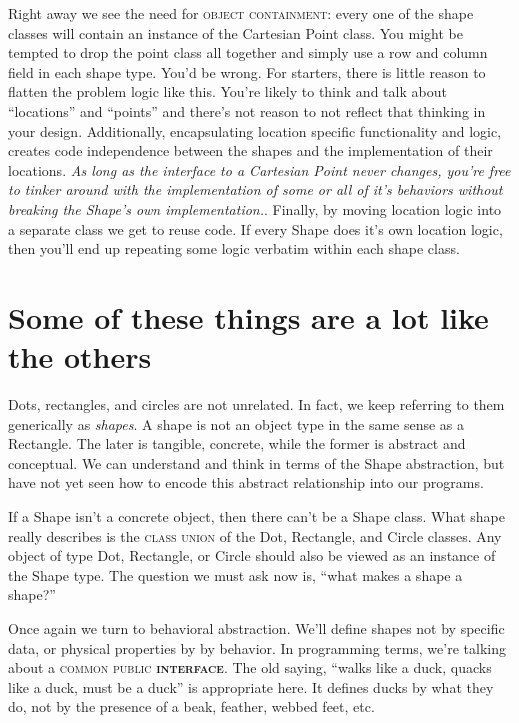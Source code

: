\documentclass[]{tufte-handout}
\begin{document}
Right away we see the need for \textsc{object containment}: every one of the shape classes will contain an instance of the Cartesian Point class. You might be tempted to drop the point class all together and simply use a row and column field in each shape type. You'd be wrong. For starters, there is little reason to flatten the problem logic like this. You're likely to think and talk about ``locations'' and ``points'' and there's not reason to not reflect that thinking in your design. Additionally, encapsulating location specific functionality and logic, creates code independence between the shapes and the implementation of their locations. \textit{As long as the interface to a Cartesian Point never changes, you're free to tinker around with the implementation of some or all of it's behaviors without breaking the Shape's own implementation.}. Finally, by moving location logic into a separate class we get to reuse code. If every Shape does it's own location logic, then you'll end up repeating some logic verbatim within each shape class. 

\section{Some of these things are a lot like the others}  

Dots, rectangles, and circles are not unrelated. In fact, we keep referring to them generically as \textit{shapes}.  A shape is not an object type in the same sense as a Rectangle. The later is tangible, concrete, while the former is abstract and conceptual. We can understand and think in terms of the Shape abstraction, but have not yet seen how to encode this abstract relationship into our programs. 

If a Shape isn't a concrete object, then there can't be a Shape class. What shape really describes is the \textsc{class union} of the Dot, Rectangle, and Circle classes. Any object of type Dot, Rectangle, or Circle should also be viewed as an instance of the Shape type. The question we must ask now is, ``what makes a shape a shape?'' 

Once again we turn to behavioral abstraction. We'll define shapes not by specific data, or physical properties by by behavior. In programming terms, we're talking about a \textsc{common public \textbf{interface}}. The old saying, ``walks like a duck, quacks like a duck, must be a duck'' is appropriate here. It defines ducks by what they do, not by the presence of a beak, feather, webbed feet, etc. 
\end{document}

